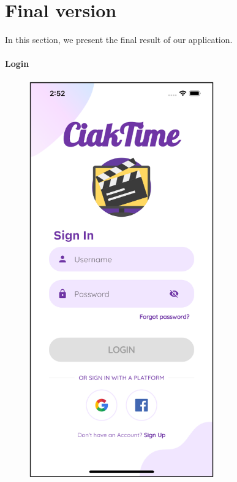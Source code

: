 \documentclass[12pt, a4paper]{article}
\numberwithin{figure}{section}
\begin{document}

\newpage

\section{Final version}

In this section, we present the final result of our application.

\paragraph{Login}

\begin{center}
	\begin{minipage}[t]{0.31\textwidth}
		\begin{figure}[H]
			\centering
			\includegraphics[width=0.71\textwidth]{images/final/login.png}\\

\end{figure}
\end{minipage}
\end{center}
\end{document}
